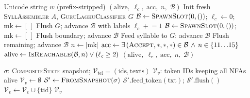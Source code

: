 \documentclass[11pt]{article}
\begin{document}
\begin{algorithm}[H]
\caption{\textsc{AnalyzeText}: Stateless FST+NFA Analysis}
\label{alg:analyze-text}
\scriptsize
\begin{algorithmic}[1]
\Require Unicode string $w$ (prefix-stripped)
\Ensure $(\text{alive},\; \ell_c,\; \text{acc},\; n,\; \mathcal{B})$
\State Init fresh \textsc{SyllAssembler} $A$,
       \textsc{GuruLaghuClassifier} $G$
\State $\mathcal{B} \gets \textsc{SpawnSlot}(0, ())$;\;
       $\ell_c \gets 0$;\; $\text{mk} \gets [\,]$
        \State Flush $G$; advance $\mathcal{B}$ with labels
            \State $\ell_c \mathrel{+}= 1$
        \EndIf
        \State $\mathcal{B} \gets \textsc{SpawnSlot}(0,())$;\;
               $\text{mk} \gets [\,]$
        \State Flush boundary; advance $\mathcal{B}$
    \Else
        \State Feed syllable to $G$; advance $\mathcal{B}$
    \EndIf
\EndFor
\State Flush remaining; advance $\mathcal{B}$
\State $n \gets |\text{mk}|$
\State $\text{acc} \gets \exists\,(\textsc{Accept},*,*,*)
       \in \mathcal{B} \,\wedge\, n \in \{11{\ldots}15\}$
\State $\text{alive} \gets \textsc{IsReachable}(\mathcal{B}, n)
       \vee (\ell_c \ge 2)$
\State \Return $(\text{alive},\; \ell_c,\; \text{acc},\; n,\; \mathcal{B})$
\end{algorithmic}
\end{algorithm}



\begin{algorithm}[H]
\caption{\textsc{BuildGanaMask}: Dynamic NFA Token Mask}
\label{alg:build-mask}
\scriptsize
\begin{algorithmic}[1]
\Require $\sigma$: \textsc{CompositeState} snapshot;\;
         $\mathcal{V}_{\text{tel}} = (\text{ids}, \text{texts})$
\Ensure $\mathcal{V}_v$: token IDs keeping all NFAs alive
\State $\mathcal{V}_v \gets \emptyset$
    \State $\mathcal{S}' \gets
           \textsc{FromSnapshot}(\sigma)$
    \State $\mathcal{S}'.\text{feed\_token}(\text{txt})$;\;
           $\mathcal{S}'.\text{flush}()$
        \State $\mathcal{V}_v \gets \mathcal{V}_v
               \cup \{\text{tid}\}$
    \EndIf
\EndFor
\State \Return $\mathcal{V}_v$
\end{algorithmic}
\end{algorithm}
\end{document}
